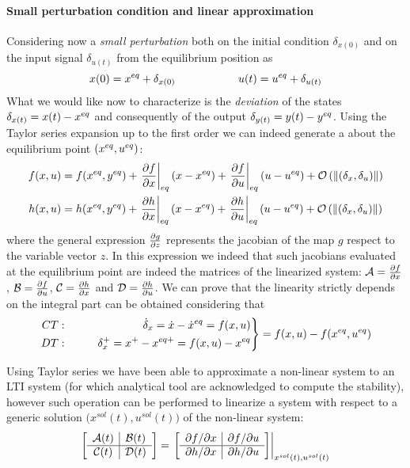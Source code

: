		\paragraph{Small perturbation condition and linear approximation} Considering now a \textit{small perturbation} both on the initial condition $\delta_{x(0)}$ and on the input signal $\delta_{u(t)}$ from the equilibrium position as
		\[ x(0) = x^{eq} + \delta_{x(0)} \hspace{2cm} u(t) = u^{eq} + \delta_{u(t)}  \]
		What we would like now to characterize is the \textit{deviation} of the states $\delta_{x(t)} = x(t) - x^{eq}$ and consequently of the output $\delta_{y(t)} = y(t) - y^{eq}$. Using the Taylor series expansion up to the first order we can indeed generate a  about the equilibrium point $(x^{eq},u^{eq})$:
		\begin{equation}
		\begin{aligned}
			f(x,u) & = f(x^{eq},y^{eq}) + \left.\frac{\partial f}{\partial x} \right|_{eq} (x-x^{eq}) + \left. \frac{\partial f}{\partial u} \right|_{eq} (u-u^{eq}) + \mathcal O \left( \left\| (\delta_x,\delta_u) \right\| \right) \\ 
			h(x,u) & = h(x^{eq},y^{eq}) + \left.\frac{\partial h}{\partial x} \right|_{eq} (x-x^{eq}) + \left. \frac{\partial h}{\partial u} \right|_{eq} (u-u^{eq}) + \mathcal O \left( \left\| (\delta_x,\delta_u) \right\| \right)
		\end{aligned}
		\end{equation}
		where the general expression $\frac{\partial g}{\partial z}$ represents the jacobian of the map $g$ respect to the variable vector $z$. In this expression we indeed that such jacobians evaluated at the equilibrium point are indeed the matrices of the linearized system: $\mathcal{A} = \frac{\partial f}{\partial x}$, $\mathcal{B} = \frac{\partial f}{\partial u}$, $\mathcal{C} = \frac{\partial h}{\partial x}$ and $\mathcal{D}= \frac{\partial h}{\partial u}$. We can prove that the linearity strictly depends on the integral part can be obtained considering that
		\[ \left. \begin{aligned}
			CT:&& \qquad \dot \delta_x = \dot x - \dot x^{eq} = f(x,u)& \\
			DT:&& \qquad \delta_x^+ = x^+ - x^{eq+} = f(x,u) - x^{eq}& 
		\end{aligned} \right\}	 = f(x,u)  - f(x^{eq},u^{eq}) \]
		
		Using Taylor series we have been able to approximate a non-linear system to an LTI system (for which analytical tool are acknowledged to compute the stability), however such operation can be performed to linearize a system with respect to a generic solution $\big(x^{sol}(t),u^{sol}(t)\big)$ of the non-linear system:
		\[ \begin{bmatrix} \begin{array}{c|c}
				\mathcal{A}(t) & \mathcal{B}(t) \\ \hline \mathcal{C}(t) & \mathcal{D}(t)
		\end{array} \end{bmatrix} = \left. \begin{bmatrix} \begin{array}{c|c}
			\partial f/\partial x & \partial f/\partial u \\ \hline \partial h/\partial x & \partial h/\partial u
		\end{array} \end{bmatrix} \right|_{x^{sol}(t),u^{sol}(t)} \]
		
